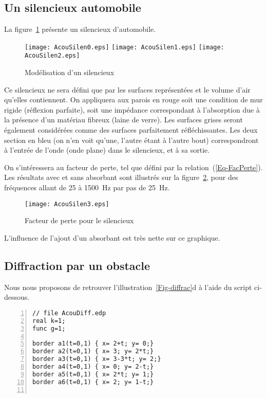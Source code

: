{\medskip
\subsection{Un silencieux automobile}

La figure~\ref{Fig-AcouSilen} présente un silencieux d'automobile.
\begin{figure}[h!]
\centering
\texttt{[image: AcouSilen0.eps]}\hfill
\texttt{[image: AcouSilen1.eps]}\hfill
\texttt{[image: AcouSilen2.eps]}
\caption{Modélisation d'un silencieux}\label{Fig-AcouSilen}
\end{figure}
Ce silencieux ne sera défini que par les surfaces représentées et le volume d'air qu'elles contiennent. On appliquera aux parois en rouge soit une condition de mur rigide (réflexion parfaite), soit une impédance correspondant à l'absorption due à la présence d'un matériau fibreux (laine de verre). Les surfaces grises seront également considérées comme des surfaces parfaitement réfléchissantes. Les deux section en bleu (on n'en voit qu'une, l'autre étant à l'autre bout) correspondront à l'entrée de l'onde (onde plane) dans le silencieux, et à sa sortie.

On s'intéressera au facteur de perte, tel que défini par la relation~(\ref{Eq-FacPerte}). Les résultats avec et sans absorbant sont illustrés sur la figure~\ref{Fig-AcouSilenRes}, pour des fréquences allant de 25 à 1500~Hz par pas de 25~Hz.
\begin{figure}[h!]
\centering
\texttt{[image: AcouSilen3.eps]}
\caption{Facteur de perte pour le silencieux}\label{Fig-AcouSilenRes}
\end{figure}
L'influence de l'ajout d'un absorbant est très nette sur ce graphique.

\medskip
\subsection{Diffraction par un obstacle}

Nous nous proposons de retrouver l'illustration~\ref{Fig-diffrac}d à l'aide du script \freefem ci-dessous.
\scriptsize
\begin{Verbatim}[numbers=left,numbersep=3pt]
// file AcouDiff.edp
real k=1;
func g=1;

border a1(t=0,1) { x= 2+t; y= 0;}
border a2(t=0,1) { x= 3; y= 2*t;}
border a3(t=0,1) { x= 3-3*t; y= 2;}
border a4(t=0,1) { x= 0; y= 2-t;}
border a5(t=0,1) { x= 2*t; y= 1;}
border a6(t=0,1) { x= 2; y= 1-t;}


\end{Verbatim}}
